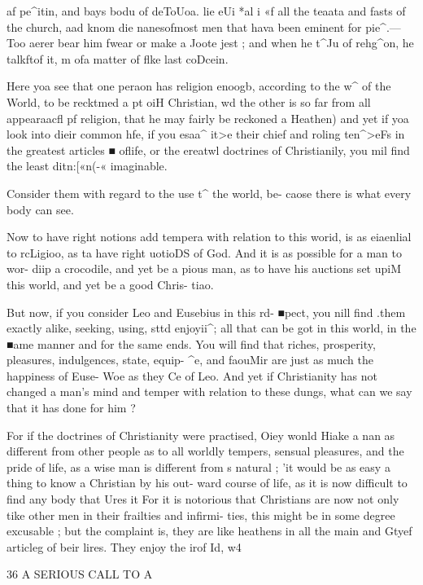 \documentclass[
]{book}
\begin{document}
af pe\^{}itin, and bays bodu of deToUoa. lie eUi *al\textbar{} i «f all the teaata and fasts of the church, aad knom die nanesofmost men that hava been eminent for pie\^{}.--- Too aerer bear him fwear or make a Joote jest ; and when he t\^{}Ju of rehg\^{}on, he talkftof it, m ofa matter of flke last coDcein.

Here yoa see that one peraon has religion enoogb, according to the w\^{} of the World, to be recktmed a pt oiH Christian, wd the other is so far from all appearaacfl pf religion, that he may fairly be reckoned a Heathen) and yet if yoa look into dieir common hfe, if you esaa\^{} it\textgreater e their chief and roling ten\^{}\textgreater eFs in the greatest articles ■ oflife, or the ereatwl doctrines of Christianily, you mil find the least ditn:{[}«n(-« imaginable.

Consider them with regard to the use t\^{} the world, be- caose there is what every body can see.

Now to have right notions add tempera with relation to this worid, is as eiaenlial to rcLigioo, as ta have right uotioDS of God. And it is as possible for a man to wor- diip a crocodile, and yet be a pious man, as to have his auctions set upiM this world, and yet be a good Chris- tiao.

But now, if you consider Leo and Eusebius in this rd- ■pect, you nill find .them exactly alike, seeking, using, sttd enjoyii\^{}; all that can be got in this world, in the ■ame manner and for the same ends. You will find that riches, prosperity, pleasures, indulgences, state, equip- \^{}e, and faouMir are just as much the happiness of Euse- Woe as they Ce of Leo. And yet if Christianity has not changed a man's mind and temper with relation to these dungs, what can we say that it has done for him ?

For if the doctrines of Christianity were practised, Oiey wonld Hiake a nan as different from other people as to all worldly tempers, sensual pleasures, and the pride of life, as a wise man is different from s natural ; 'it would be as easy a thing to know a Christian by his out- ward course of life, as it is now difficult to find any body that Ures it For it is notorious that Christians are now not only tike other men in their frailties and infirmi- ties, this might be in some degree excusable ; but the complaint is, they are like heathens in all the main and Gtyef articleg of \textbar beir lires. They enjoy the irof Id, w4

36 A SERIOUS CALL TO A
\end{document}
